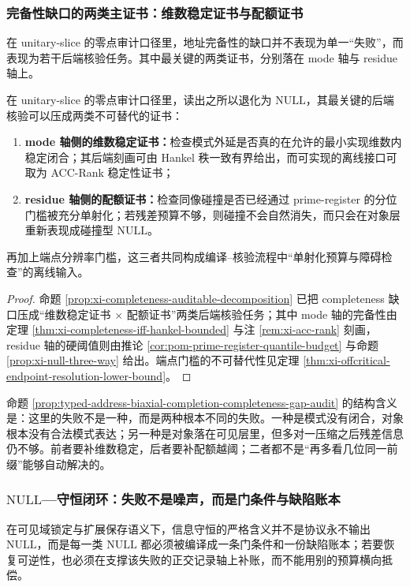 \subsubsection{完备性缺口的两类主证书：维数稳定证书与配额证书}\label{subsubsec:typed-address-biaxial-completion-completeness-gap}
在 unitary-slice 的零点审计口径里，地址完备性的缺口并不表现为单一“失败”，而表现为若干后端核验任务。其中最关键的两类证书，分别落在 mode 轴与 residue 轴上。

\begin{proposition}[完备性缺口的可审计分解]\label{prop:typed-address-biaxial-completion-completeness-gap-audit}
在 unitary-slice 的零点审计口径里，读出之所以退化为 \(\mathrm{NULL}\)，其最关键的后端核验可以压成两类不可替代的证书：
\begin{enumerate}
  \item \textbf{mode 轴侧的维数稳定证书：}检查模式外延是否真的在允许的最小实现维数内稳定闭合；其后端刻画可由 Hankel 秩一致有界给出，而可实现的离线接口可取为 ACC-Rank 稳定性证书；
  \item \textbf{residue 轴侧的配额证书：}检查同像碰撞是否已经通过 prime-register 的分位门槛被充分单射化；若残差预算不够，则碰撞不会自然消失，而只会在对象层重新表现成碰撞型 \(\mathrm{NULL}\)。
\end{enumerate}
再加上端点分辨率门槛，这三者共同构成编译--核验流程中“单射化预算与障碍检查”的离线输入。
\end{proposition}
\begin{proof}
命题 \ref{prop:xi-completeness-auditable-decomposition} 已把 completeness 缺口压成“维数稳定证书 \(\times\) 配额证书”两类后端核验任务；其中 mode 轴的完备性由定理 \ref{thm:xi-completeness-iff-hankel-bounded} 与注 \ref{rem:xi-acc-rank} 刻画，residue 轴的硬阈值则由推论 \ref{cor:pom-prime-register-quantile-budget} 与命题 \ref{prop:xi-null-three-way} 给出。端点门槛的不可替代性见定理 \ref{thm:xi-offcritical-endpoint-resolution-lower-bound}。
\end{proof}

命题 \ref{prop:typed-address-biaxial-completion-completeness-gap-audit} 的结构含义是：这里的失败不是一种，而是两种根本不同的失败。一种是模式没有闭合，对象根本没有合法模式表达；另一种是对象落在可见层里，但多对一压缩之后残差信息仍不够。前者要补维数稳定，后者要补配额越阈；二者都不是“再多看几位同一前缀”能够自动解决的。

\subsubsection{\texorpdfstring{$\mathrm{NULL}$}{NULL}—守恒闭环：失败不是噪声，而是门条件与缺陷账本}\label{subsubsec:typed-address-biaxial-completion-null-conservation-loop}
在可见域锁定与扩展保存语义下，信息守恒的严格含义并不是协议永不输出 \(\mathrm{NULL}\)，而是每一类 \(\mathrm{NULL}\) 都必须被编译成一条门条件和一份缺陷账本；若要恢复可逆性，也必须在支撑该失败的正交记录轴上补账，而不能用别的预算横向抵偿。

